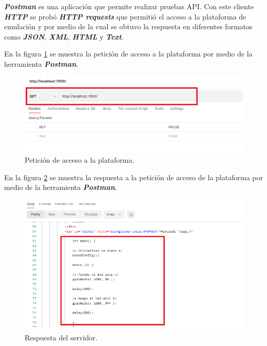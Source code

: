 \textit{\textbf{Postman}} es una aplicación que permite realizar pruebas API. Con este cliente \textit{\textbf{HTTP}} se probó \textit{\textbf{HTTP requests}} que permitió el acceso a la plataforma de emulación y por medio de la cual se obtuvo la respuesta en diferentes formatos como  \textit{\textbf{JSON}}, \textit{\textbf{XML}}, \textit{\textbf{HTML}} y \textit{\textbf{Text}}.


En la figura \ref{fig:PostmanBlinky3} se muestra la petición de acceso a la plataforma por medio de la herramienta \textit{\textbf{Postman}}.

\begin{figure}[ht]
	\centering
	\includegraphics[scale=.50]{./Figures/PostmanBlinky3.png}
	\caption{Petición de acceso a la plataforma.}
	\label{fig:PostmanBlinky3}
\end{figure}




En la figura \ref{fig:PostmanBlinky2} se muestra la respuesta a la petición de acceso de la plataforma por medio de la herramienta \textit{\textbf{Postman}}.

\begin{figure}[ht]
	\centering
	\includegraphics[scale=.37]{./Figures/PostmanBlinky2.png}
	\caption{Respuesta del servidor.}
	\label{fig:PostmanBlinky2}
\end{figure}

